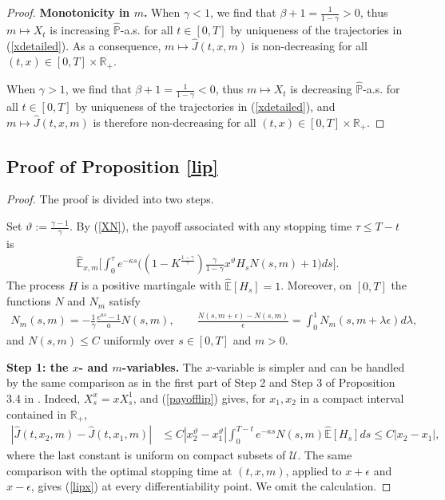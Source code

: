 \documentclass[a4paper,11pt]{amsart}
\numberwithin{equation}{section}
\begin{document}
{\begin{proof}
\textbf{Monotonicity in $m$.} When $\gamma<1$, we find that $\beta+1 = \frac{1}{1-\gamma}>0$, thus $m \mapsto X_t$ is increasing $\widehat{\mathbb{P}}$-a.s. for all $t \in [0,T]$ by uniqueness of the trajectories {in (\ref{xdetailed})}. As a consequence, $m \mapsto \widehat{J}(t,x,m) $ is non-decreasing for all $(t,x)  \in [0,T] \times \mathbb{R}_+.$

When $\gamma>1$, we find that $\beta+1 = \frac{1}{1-\gamma}<0$, thus $m \mapsto X_t$ is decreasing $\widehat{\mathbb{P}}$-a.s. for all $t \in [0,T]$ by uniqueness of the trajectories in (\ref{xdetailed}), and $m \mapsto \widehat{J}(t,x,m) $ is therefore non-decreasing for all $(t,x)  \in [0,T] \times \mathbb{R}_+.$

\end{proof}







\subsection{Proof of Proposition \ref{lip}}
\begin{proof}\label{prolip}
\color{black}
The proof is divided into two steps. 

Set $\vartheta:=\frac{\gamma-1}{\gamma}$. By (\ref{XN}), the payoff associated with any stopping time $\tau\leq T-t$ is
\begin{align}\label{payofflip}
\widehat{\mathbb E}_{x,m}\bigg[\int_0^\tau e^{-\kappa s}\bigg((1-K^{\frac{1-\gamma}{\gamma}})\frac{\gamma}{1-\gamma}x^\vartheta H_sN(s,m)+1\bigg)ds\bigg].
\end{align}
The process $H$ is a positive martingale with $\widehat{\mathbb E}[H_s]=1$. Moreover, on $[0,T]$ the functions $N$ and $N_m$ satisfy
\begin{align}\label{Nm}
N_m(s,m)=-\frac{1}{\gamma}\frac{e^{as}-1}{a}N(s,m),\qquad \frac{N(s,m+\epsilon)-N(s,m)}{\epsilon}=\int_0^1N_m(s,m+\lambda\epsilon)d\lambda,
\end{align}
and $N(s,m)\leq C$ uniformly over $s\in[0,T]$ and $m>0$.

\textbf{Step 1: the $x$- and $m$-variables.} The $x$-variable is simpler and can be handled by the same comparison as in the first part of Step 2 and Step 3 of Proposition 3.4 in \citet{de2019free}. Indeed, $X_s^x=xX_s^1$, and (\ref{payofflip}) gives, for $x_1,x_2$ in a compact interval contained in $\mathbb R_+$,
\begin{align*}
|\widehat J(t,x_2,m)-\widehat J(t,x_1,m)|&\leq C|x_2^\vartheta-x_1^\vartheta|\int_0^{T-t}e^{-\kappa s}N(s,m)\widehat{\mathbb E}[H_s]ds\leq C|x_2-x_1|,
\end{align*}
where the last constant is uniform on compact subsets of $\mathcal U$. The same comparison with the optimal stopping time at $(t,x,m)$, applied to $x+\epsilon$ and $x-\epsilon$, gives (\ref{lipx}) at every differentiability point. We omit the calculation.


\end{proof}}
\end{document}
